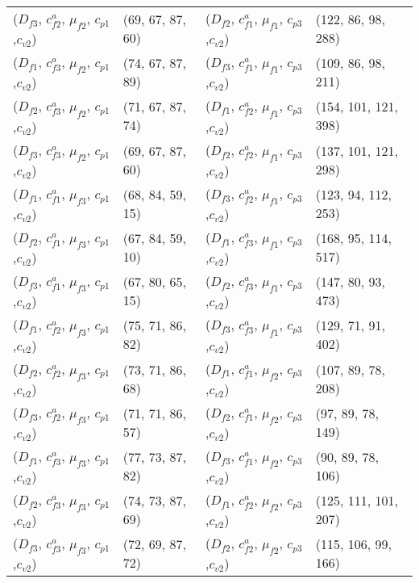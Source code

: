 \documentclass[preprint,12pt]{elsarticle}
\begin{document}
\begin{appendices}
\begin{table}[htbp]
\begin{tabular}{llll}
    ($D_{f3}$, $c^{a}_{f2}$, $\mu_{f2}$, $c_{p1}$,$c_{v2}$) & (69, 67, 87, 60) & ($D_{f2}$, $c^{a}_{f1}$, $\mu_{f1}$, $c_{p3}$,$c_{v2}$) & (122, 86, 98, 288) \\
    ($D_{f1}$, $c^{a}_{f3}$, $\mu_{f2}$, $c_{p1}$,$c_{v2}$) & (74, 67, 87, 89) & ($D_{f3}$, $c^{a}_{f1}$, $\mu_{f1}$, $c_{p3}$,$c_{v2}$) & (109, 86, 98, 211) \\
    ($D_{f2}$, $c^{a}_{f3}$, $\mu_{f2}$, $c_{p1}$,$c_{v2}$) & (71, 67, 87, 74) & ($D_{f1}$, $c^{a}_{f2}$, $\mu_{f1}$, $c_{p3}$,$c_{v2}$) & (154, 101, 121, 398) \\
    ($D_{f3}$, $c^{a}_{f3}$, $\mu_{f2}$, $c_{p1}$,$c_{v2}$) & (69, 67, 87, 60) & ($D_{f2}$, $c^{a}_{f2}$, $\mu_{f1}$, $c_{p3}$,$c_{v2}$) & (137, 101, 121, 298) \\
    ($D_{f1}$, $c^{a}_{f1}$, $\mu_{f3}$, $c_{p1}$,$c_{v2}$) & (68, 84, 59, 15) & ($D_{f3}$, $c^{a}_{f2}$, $\mu_{f1}$, $c_{p3}$,$c_{v2}$) & (123, 94, 112, 253) \\
    ($D_{f2}$, $c^{a}_{f1}$, $\mu_{f3}$, $c_{p1}$,$c_{v2}$) & (67, 84, 59, 10) & ($D_{f1}$, $c^{a}_{f3}$, $\mu_{f1}$, $c_{p3}$,$c_{v2}$) & (168, 95, 114, 517) \\
    ($D_{f3}$, $c^{a}_{f1}$, $\mu_{f3}$, $c_{p1}$,$c_{v2}$) & (67, 80, 65, 15) & ($D_{f2}$, $c^{a}_{f3}$, $\mu_{f1}$, $c_{p3}$,$c_{v2}$) & (147, 80, 93, 473) \\
    ($D_{f1}$, $c^{a}_{f2}$, $\mu_{f3}$, $c_{p1}$,$c_{v2}$) & (75, 71, 86, 82) & ($D_{f3}$, $c^{a}_{f3}$, $\mu_{f1}$, $c_{p3}$,$c_{v2}$) & (129, 71, 91, 402) \\
    ($D_{f2}$, $c^{a}_{f2}$, $\mu_{f3}$, $c_{p1}$,$c_{v2}$) & (73, 71, 86, 68) & ($D_{f1}$, $c^{a}_{f1}$, $\mu_{f2}$, $c_{p3}$,$c_{v2}$) & (107, 89, 78, 208) \\
    ($D_{f3}$, $c^{a}_{f2}$, $\mu_{f3}$, $c_{p1}$,$c_{v2}$) & (71, 71, 86, 57) & ($D_{f2}$, $c^{a}_{f1}$, $\mu_{f2}$, $c_{p3}$,$c_{v2}$) & (97, 89, 78, 149) \\
    ($D_{f1}$, $c^{a}_{f3}$, $\mu_{f3}$, $c_{p1}$,$c_{v2}$) & (77, 73, 87, 82) & ($D_{f3}$, $c^{a}_{f1}$, $\mu_{f2}$, $c_{p3}$,$c_{v2}$) & (90, 89, 78, 106) \\
    ($D_{f2}$, $c^{a}_{f3}$, $\mu_{f3}$, $c_{p1}$,$c_{v2}$) & (74, 73, 87, 69) & ($D_{f1}$, $c^{a}_{f2}$, $\mu_{f2}$, $c_{p3}$,$c_{v2}$) & (125, 111, 101, 207) \\
    ($D_{f3}$, $c^{a}_{f3}$, $\mu_{f3}$, $c_{p1}$,$c_{v2}$) & (72, 69, 87, 72) & ($D_{f2}$, $c^{a}_{f2}$, $\mu_{f2}$, $c_{p3}$,$c_{v2}$) & (115, 106, 99, 166) \\

\end{tabular}
\end{table}
\end{appendices}
\end{document}
